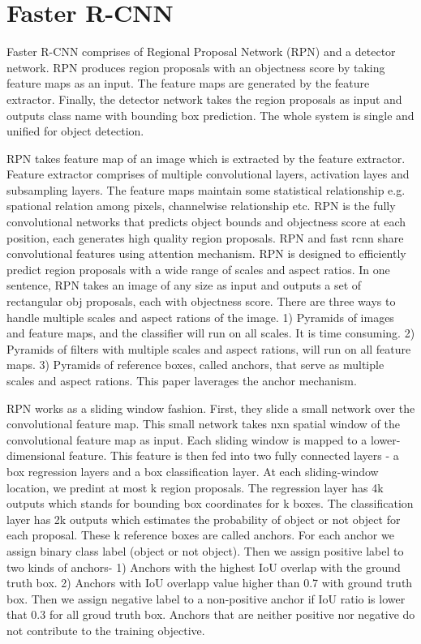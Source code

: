 \documentclass[10pt,twocolumn,letterpaper]{article}
\begin{document}
\section{Faster R-CNN}
Faster R-CNN comprises of Regional Proposal Network (RPN) and a detector network. RPN produces region proposals with an objectness score by taking feature maps as an input. The feature maps are generated by the feature extractor. Finally, the detector network takes the region proposals as input and outputs class name with bounding box prediction. The whole system is single and unified for object detection. 

RPN takes feature map of an image which is extracted by the feature extractor. Feature extractor comprises of multiple convolutional layers, activation layes and subsampling layers. The feature maps maintain some statistical relationship e.g. spational relation among pixels, channelwise relationship etc. RPN is the fully convolutional networks that predicts object bounds and objectness score at each position, each generates high quality region proposals. RPN and fast rcnn share convolutional features using attention mechanism. RPN is designed to efficiently predict region proposals with a wide range of scales and aspect ratios. In one sentence, RPN takes an image of any size as input and outputs a set of rectangular obj proposals, each with objectness score. There are three ways to handle multiple scales and aspect rations of the image. 1) Pyramids of images and feature maps, and the classifier will run on all scales. It is time consuming. 2) Pyramids of filters with multiple scales and aspect rations, will run on all feature maps. 3) Pyramids of reference boxes, called anchors, that serve as multiple scales and aspect rations. This paper laverages the anchor mechanism. \cite{NIPS2015_5638}

RPN works as a sliding window fashion. First, they slide a small network over the convolutional feature map. This small network takes nxn spatial window of the convolutional feature map as input. Each sliding window is mapped to a lower-dimensional feature. This feature is then fed into two fully connected layers - a box regression layers and a box classification layer. At each sliding-window location, we predint at most k region proposals. The regression layer has 4k outputs which stands for bounding box coordinates for k boxes. The classification layer has 2k outputs which estimates the probability of object or not object for each proposal. These k reference boxes are called anchors. For each anchor we assign binary class label (object or not object). Then we assign positive label to two kinds of anchors- 1) Anchors with the highest IoU overlap with the ground truth box. 2) Anchors with IoU overlapp value higher than 0.7 with ground truth box. Then we assign negative label to a non-positive anchor if IoU ratio is lower that 0.3 for all groud truth box. Anchors that are neither positive nor negative do not contribute to the training objective. \cite{NIPS2015_5638}
\end{document}
